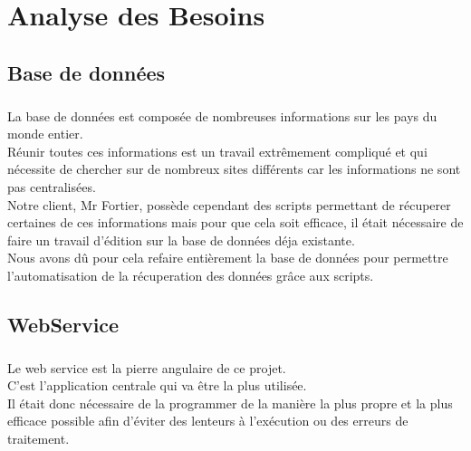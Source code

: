 \chapter{Analyse des Besoins}
\section{Base de données}
\paragraph{}La base de données est composée de nombreuses informations sur les pays du monde entier.\\
Réunir toutes ces informations est un travail extrêmement compliqué et qui nécessite de chercher sur de nombreux sites différents car les informations ne sont pas centralisées.\\
Notre client, Mr Fortier, possède cependant des scripts permettant de récuperer certaines de ces informations mais pour que cela soit efficace, il était nécessaire de faire un travail d'édition sur la base de données déja existante.\\
Nous avons dû pour cela refaire entièrement la base de données pour permettre l'automatisation de la récuperation des données grâce aux scripts.\\
\section{WebService}
\paragraph{} Le web service est la pierre angulaire de ce projet.\\ 
C'est l'application centrale qui va être la plus utilisée.\\
Il était donc nécessaire de la programmer de la manière la plus propre et la plus efficace possible afin d'éviter des lenteurs à l'exécution ou des erreurs de traitement.\\